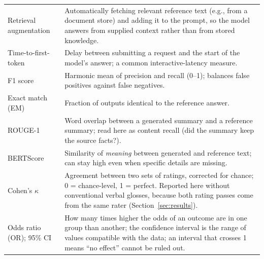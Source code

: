 \documentclass[11pt]{article}
\begin{document}
\begin{table}[ht]
\begin{tabular}{@{}p{3.4cm}p{11.4cm}@{}}
Retrieval augmentation & Automatically fetching relevant reference text (e.g., from a document store) and adding it to the prompt, so the model answers from supplied context rather than from stored knowledge. \\
Time-to-first-token & Delay between submitting a request and the start of the model's answer; a common interactive-latency measure. \\
F1 score & Harmonic mean of precision and recall (0--1); balances false positives against false negatives. \\
Exact match (EM) & Fraction of outputs identical to the reference answer. \\
ROUGE-1 & Word overlap between a generated summary and a reference summary; read here as content recall (did the summary keep the source facts?). \\
BERTScore & Similarity of \emph{meaning} between generated and reference text; can stay high even when specific details are missing. \\
Cohen's $\kappa$ & Agreement between two sets of ratings, corrected for chance; 0 = chance-level, 1 = perfect. Reported here without conventional verbal glosses, because both rating passes come from the same rater (Section~\ref{sec:results}). \\
Odds ratio (OR); 95\% CI & How many times higher the odds of an outcome are in one group than another; the confidence interval is the range of values compatible with the data; an interval that crosses 1 means ``no effect'' cannot be ruled out. \\
\bottomrule
\end{tabular}
\end{table}
\clearpage  %



\end{document}
